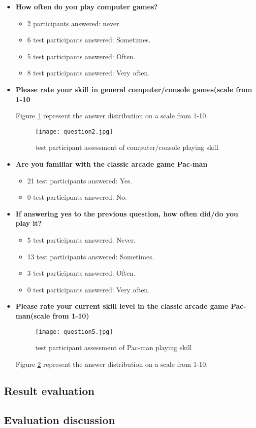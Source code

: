 \begin{itemize}
\item \textbf{How often do you play computer games?}
\begin{itemize}
\item 2 participants answered: never.
\item 6 test participants answered: Sometimes.
\item 5 test participants answered: Often.
\item 8 test participants answered: Very often.
\end{itemize}
\item \textbf{Please rate your skill in general computer/console games(scale from 1-10}

Figure \ref{fig:question2} represent the answer distribution on a scale from 1-10.

\begin{figure}[!htbp]
\centering
\texttt{[image: question2.jpg]}
\caption{test participant assessment of computer/console playing skill}
\label{fig:question2}
\end{figure}

\item \textbf{Are you familiar with the classic arcade game Pac-man}
\begin{itemize}
\item 21 test participants answered: Yes.
\item 0 test participants answered: No.
\end{itemize}
\item \textbf{If answering yes to the previous question, how often did/do you play it?}
\begin{itemize}
\item 5 test participants answered: Never.
\item 13 test participants answered: Sometimes.
\item 3 test participants answered: Often.
\item 0 test participants answered: Very often.
\end{itemize}
\item \textbf{Please rate your current skill level in the classic arcade game Pac-man(scale from 1-10)}

\begin{figure}[!htbp]
\centering
\texttt{[image: question5.jpg]}
\caption{test participant assessment of Pac-man playing skill}
\label{fig:question5}
\end{figure}

Figure \ref{fig:question5} represent the answer distribution on a scale from 1-10.


\end{itemize} 

\subsection{Result evaluation} \label{resulteval}





\subsection{Evaluation discussion}